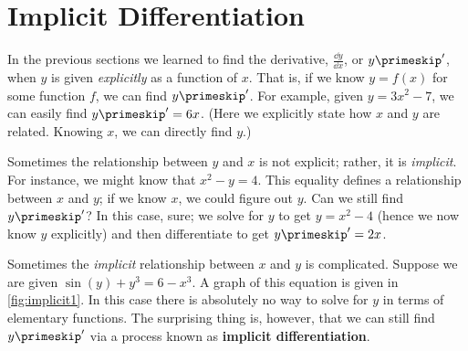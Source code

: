 \section{Implicit Differentiation}\label{sec:imp_deriv}

In the previous sections we learned to find the derivative, $ \frac{\dd y}{\dd x}$, or $y\primeskip'$, when $y$ is given \emph{explicitly} as a function of $x$. That is, if we know $y=f(x)$ for some function $f$, we can find $y\primeskip'$. For example, given  $y=3x^2-7$, we can easily find $y\primeskip'=6x$. (Here we explicitly state how $x$ and $y$ are related. Knowing $x$, we can directly find $y$.)

Sometimes the relationship between $y$ and $x$ is not explicit; rather, it is \emph{implicit}. For instance, we might know that $x^2-y=4$. This equality defines a relationship between $x$ and $y$; if we know $x$, we could figure out $y$. Can we still find $y\primeskip'$?  In this case, sure; we  solve for $y$ to get $y=x^2-4$ (hence we now know $y$ explicitly)  and then differentiate to get $y\primeskip'=2x$.

Sometimes the \emph{implicit} relationship between $x$ and $y$ is complicated.  Suppose we are given $\sin(y)+y^3=6-x^3$. A graph of this equation is given in \autoref{fig:implicit1}. In this case there is absolutely no way to solve for $y$ in terms of elementary functions.  The surprising thing is, however, that we can still find $y\primeskip'$ via a process known as \textbf{implicit differentiation}.


